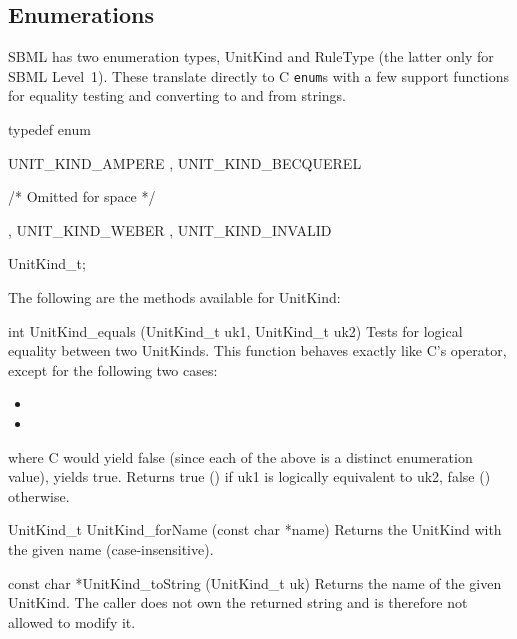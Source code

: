 \documentclass{sbmlmanual}
\begin{document}
\subsection{Enumerations}
\label{sec:enumerations}

SBML has two enumeration types, UnitKind and RuleType (the latter only for
SBML Level~1).  These translate directly to C \texttt{enum}s with a few
support functions for equality testing and converting to and from strings.


\begin{example}[c]
typedef enum
{
    UNIT_KIND_AMPERE
  , UNIT_KIND_BECQUEREL

   /* Omitted for space */

  , UNIT_KIND_WEBER
  , UNIT_KIND_INVALID
} UnitKind_t;
\end{example}

The following are the methods available for UnitKind:

\begin{methoddef}{int UnitKind\_equals (UnitKind\_t uk1, UnitKind\_t uk2)}
  Tests for logical equality between two UnitKinds.  This function behaves
  exactly like C's \code{==} operator, except for the following two cases:

\begin{itemize}
  \item {}
  \item {}
\end{itemize}

  where C would yield false (since each of the above is a distinct
  enumeration value),  yields true.
  Returns true () if uk1 is logically equivalent to uk2, false
  () otherwise.
\end{methoddef}
  
\begin{methoddef}{UnitKind\_t UnitKind\_forName (const char *name)}
  Returns the UnitKind with the given name (case-insensitive).
\end{methoddef}

\begin{methoddef}{const char *UnitKind\_toString (UnitKind\_t uk)}
  Returns the name of the given UnitKind.  The caller does not own the
  returned string and is therefore not allowed to modify it.
\end{methoddef}
\end{document}
